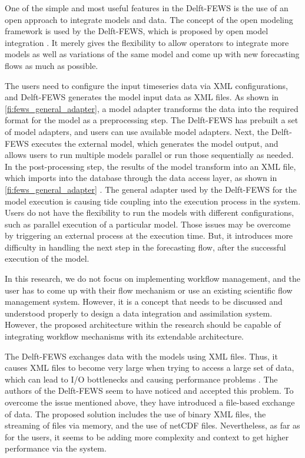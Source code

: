 One of the simple and most useful features in the Delft-FEWS is the use of an open approach to integrate models and data. The concept of the open modeling framework is used by the Delft-FEWS, which is proposed by open model integration \cite{Kokkonen2003InterfacingXML}. It merely gives the flexibility to allow operators to integrate more models as well as variations of the same model and come up with new forecasting flows as much as possible.

The users need to configure the input timeseries data via XML configurations, and Delft-FEWS generates the model input data as XML files. As shown in \cref{fi:fews_general_adapter}, a model adapter transforms the data into the required format for the model as a preprocessing step. The Delft-FEWS has prebuilt a set of model adapters, and users can use available model adapters. Next, the Delft-FEWS executes the external model, which generates the model output, and allows users to run multiple models parallel or run those sequentially as needed. In the post-processing step, the results of the model transform into an XML file, which imports into the database through the data access layer, as shown in \cref{fi:fews_general_adapter} \cite{Werner2013TheSystem}. The general adapter used by the Delft-FEWS for the model execution is causing tide coupling into the execution process in the system. Users do not have the flexibility to run the models with different configurations, such as parallel execution of a particular model. Those issues may be overcome by triggering an external process at the execution time. But, it introduces more difficulty in handling the next step in the forecasting flow, after the successful execution of the model. 

In this research, we do not focus on implementing workflow management, and the user has to come up with their flow mechanism or use an existing scientific flow management system. However, it is a concept that needs to be discussed and understood properly to design a data integration and assimilation system. However, the proposed architecture within the research should be capable of integrating workflow mechanisms with its extendable architecture.

The Delft-FEWS exchanges data with the models using XML files. Thus, it causes XML files to become very large when trying to access a large set of data, which can lead to I/O bottlenecks and causing performance problems \cite{Werner2013TheSystem}. The authors of the Delft-FEWS \cite{Werner2013TheSystem} seem to have noticed and accepted this problem. To overcome the issue mentioned above, they have introduced a file-based exchange of data. The proposed solution includes the use of binary XML files, the streaming of files via memory, and the use of netCDF files. Nevertheless, as far as for the users, it seems to be adding more complexity and context to get higher performance via the system.


